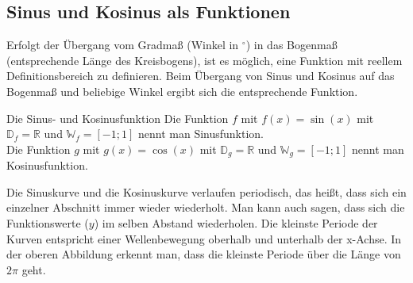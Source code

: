 \subsection{Sinus und Kosinus als Funktionen}
Erfolgt der Übergang vom Gradmaß (Winkel in $^{\circ}$) in das Bogenmaß (entsprechende Länge des Kreisbogens), ist es möglich, eine Funktion mit reellem Definitionsbereich zu definieren.
Beim Übergang von Sinus und Kosinus auf das Bogenmaß und beliebige Winkel ergibt sich die entsprechende Funktion.
\begin{b8d}{Die Sinus- und Kosinusfunktion}{}
 Die Funktion $f$ mit  $f(x) = \sin{(x)}$ mit $\mathds{D}_f = \mathds{R}$ und $\mathds{W}_f = [-1;1]$ nennt man Sinusfunktion.\\
 Die Funktion $g$ mit  $g(x) = \cos{(x)}$ mit $\mathds{D}_g = \mathds{R}$ und $\mathds{W}_g = [-1;1]$ nennt man Kosinusfunktion. 

\begin{center}
\end{center}
Die Sinuskurve und die Kosinuskurve verlaufen periodisch, das heißt, dass sich ein einzelner Abschnitt immer wieder wiederholt. Man kann auch sagen, dass sich die Funktionswerte ($y$) im selben Abstand wiederholen. Die kleinste Periode der Kurven entspricht einer Wellenbewegung oberhalb und unterhalb der x-Achse. In der oberen Abbildung erkennt man, dass die kleinste Periode über die Länge von $2\pi$ geht.
\end{b8d}
\label{GraphSinCos}

